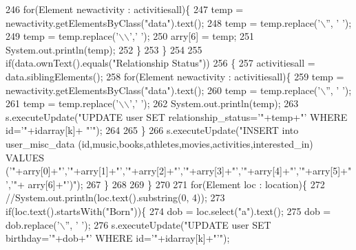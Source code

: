 \begin{DoxyCode}
246                 \textcolor{keywordflow}{for}(Element newactivity : activitiesall)\{
247                     temp = newactivity.getElementsByClass(\textcolor{stringliteral}{"data"}).text();
248                     temp = temp.replace(\textcolor{charliteral}{'\(\backslash\)''}, \textcolor{charliteral}{' '});
249                     temp = temp.replace(\textcolor{charliteral}{'\(\backslash\)\(\backslash\)'},\textcolor{charliteral}{' '});
250                     arry[6] = temp;
251                     System.out.println(temp);
252                 \}
253                 \}
254                 
255                 \textcolor{keywordflow}{if}(data.ownText().equals(\textcolor{stringliteral}{"Relationship Status"}))
256                 \{
257                     activitiesall = data.siblingElements();
258                 \textcolor{keywordflow}{for}(Element newactivity : activitiesall)\{
259                     temp = newactivity.getElementsByClass(\textcolor{stringliteral}{"data"}).text();
260                     temp = temp.replace(\textcolor{charliteral}{'\(\backslash\)''}, \textcolor{charliteral}{' '});
261                     temp = temp.replace(\textcolor{charliteral}{'\(\backslash\)\(\backslash\)'},\textcolor{charliteral}{' '});
262                     System.out.println(temp);
263                     s.executeUpdate(\textcolor{stringliteral}{"UPDATE user SET relationship\_status='"}+temp+\textcolor{stringliteral}{"' WHERE id='"}+idarray[k]+\textcolor{stringliteral}{
      "'"});
264                 
265                 \}
266                 s.executeUpdate(\textcolor{stringliteral}{"INSERT into user\_misc\_data
       (id,music,books,athletes,movies,activities,interested\_in) VALUES ('"}+arry[0]+\textcolor{stringliteral}{"','"}+arry[1]+\textcolor{stringliteral}{"','"}+arry[2]+\textcolor{stringliteral}{"','"}+arry[3]+\textcolor{stringliteral}{"','"}+arry[4]+\textcolor{stringliteral}{"','"}+arry[5]+\textcolor{stringliteral}{"','"}+
      arry[6]+\textcolor{stringliteral}{"')"});
267                 \}
268                 
269             \}
270             
271             \textcolor{keywordflow}{for}(Element loc : location)\{
272                 \textcolor{comment}{//System.out.println(loc.text().substring(0, 4));}
273                 \textcolor{keywordflow}{if}(loc.text().startsWith(\textcolor{stringliteral}{"Born"}))\{
274                     dob = loc.select(\textcolor{stringliteral}{"a"}).text();
275                     dob = dob.replace(\textcolor{charliteral}{'\(\backslash\)''}, \textcolor{charliteral}{' '});
276                     s.executeUpdate(\textcolor{stringliteral}{"UPDATE user SET birthday='"}+dob+\textcolor{stringliteral}{"' WHERE id='"}+idarray[k]+\textcolor{stringliteral}{"'"});

\end{DoxyCode}
